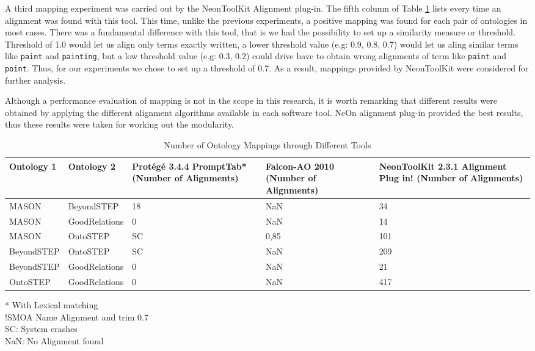 A third mapping experiment was carried out by the NeonToolKit Alignment plug-in. The fifth column of Table \ref{table4.3} lists every time an alignment was found with this tool.  This time, unlike the previous experiments, a positive mapping was found for each pair of ontologies in most cases. \cbstart There was a fundamental difference with this tool, that is we had the possibility to set up a similarity measure or threshold. Threshold of 1.0 would let us align only terms exactly written, a lower threshold value (e.g: 0.9, 0.8, 0.7) would let us aling similar terms like \texttt{paint} and \texttt{painting}, but a low threshold value (e.g: 0.3, 0.2) could drive have to obtain wrong alignments of term like \texttt{paint} and \texttt{point}. Thus, for our experiments we chose to set up a  threshold of 0.7. As a result, mappings provided by NeonToolKit were considered for further analysis. \cbend

Although a performance evaluation of mapping is not in the scope in this research, it is worth remarking that different results were obtained by applying the different alignment algorithms available in each software tool.  \cbstart NeOn alignment plug-in provided the best results, thus these results were taken for working out the modularity. \cbend



\begin{table}[tp]%
	
	\caption{Number of Ontology Mappings through Different Tools}
	\label{table4.3}\centering
	\begin{tabular}{p{2.5cm} p{2.5cm} p{2.5cm} p{2.5cm} p{2.5cm} }\toprule
		
		Ontology 1 &	Ontology 2	& Protégé 3.4.4 PromptTab*
		(Number of Alignments)	&Falcon-AO
		2010
		(Number of Alignments)	&NeonToolKit 2.3.1
		Alignment Plug in!
		(Number of Alignments) \\\toprule
		
		MASON &	BeyondSTEP&	18&	NaN	&34  \\\toprule
		MASON &	GoodRelations&	0&	NaN&	14 \\\toprule
		MASON	&OntoSTEP&	SC&	0,85&	101 \\\toprule
		BeyondSTEP&	OntoSTEP&	SC&	NaN&	209 \\\toprule
		BeyondSTEP&	GoodRelations&	0&	NaN	&21 \\\toprule
		OntoSTEP&	GoodRelations&	0&	NaN&	417 \\\toprule
		
	\end{tabular}
	\begin{flushleft}
		* With Lexical matching\\
		!SMOA Name Alignment and trim 0.7\\
		SC: System crashes \\
		NaN: No Alignment found\\
	\end{flushleft}
	
	
	
\end{table}

